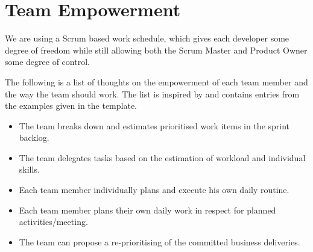\section{Team Empowerment}

We are using a Scrum based work schedule, which gives each developer some degree of freedom while still allowing both the Scrum Master
and Product Owner some degree of control.

The following is a list of thoughts on the empowerment of each team member and the way the team should work. The list is inspired by and contains entries from the examples given in the template.
\begin{itemize}
    \item The team breaks down and estimates prioritised work items in the sprint backlog.
    \item The team delegates tasks based on the estimation of workload and individual skills.
    \item Each team member individually plans and execute his own daily routine.
    \item Each team member plans their own daily work in respect for planned activities/meeting.
    \item The team can propose a re-prioritising of the committed business deliveries.
\end{itemize}
